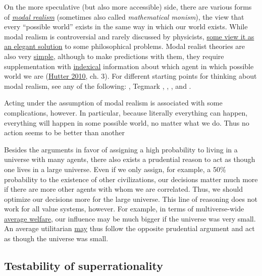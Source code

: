 On the more speculative (but also more accessible) side, there are
various forms of
\href{https://en.wikipedia.org/wiki/Modal_realism}{\emph{modal
realism}} (sometimes also called \emph{mathematical monism}), the view
that every ``possible world'' exists in the same way in which our world
exists. While modal realism is controversial and rarely discussed by
physicists,
\href{http://reducing-suffering.org/why-does-physics-exist/\#Maybe_theres_no_such_thing_as_existence}{some
view it as an elegant solution} to some philosophical problems. Modal
realist theories are also very
\href{http://lesswrong.com/lw/jp/occams_razor/}{simple}, although
to make predictions with them, they require supplementation with
\href{https://en.wikipedia.org/wiki/Indexicality\#Extensions}{indexical}
information about which agent in which possible world we are
(\href{https://arxiv.org/abs/0912.5434}{Hutter 2010}, ch. 3). For
different starting points for thinking about modal realism, see any of
the following:
\citet{Lewis1986-rk}, Tegmark \citeyear{Tegmark1998-mf}, \citeyear{Tegmark2008-sq}, \citeyear{Tegmark2014-mw}, and
\citet{Schmidhuber1997-vd}.

Acting under the assumption of modal realism is associated with some
complications, however. In particular, because literally everything can
happen, everything will happen in some possible world, no matter what we
do. Thus no action seems to be better than another~\parencite{Oesterheld2017-2}

Besides the arguments in favor of assigning a high probability to living
in a universe with many agents, there also exists a prudential reason to
act as though one lives in a large universe. Even if we only assign, for
example, a 50\% probability to the existence of other civilizations, our
decisions matter much more if there are more other agents with whom we
are correlated. Thus, we should optimize our decisions more for the
large universe. This line of reasoning does not work for all value
systems, however. For example, in terms of multiverse-wide
\href{https://en.wikipedia.org/wiki/Average_and_total_utilitarianism}{average
welfare}, our influence may be much bigger if the universe was very
small. An average utilitarian
\href{https://casparoesterheld.com/2017/03/15/the-average-utilitarians-solipsism-wager/}{may}
thus follow the opposite prudential argument and act as though the
universe was small.

\subsection{Testability of
superrationality}\label{testability-of-superrationality}

